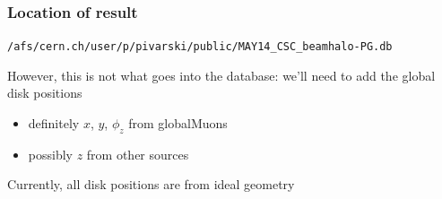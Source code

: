 \documentclass[compress]{beamer}
\begin{document}

\begin{frame}
\frametitle{Location of result}

{\tt /afs/cern.ch/user/p/pivarski/public/MAY14\_CSC\_beamhalo-PG.db}

\vfill
However, this is not what goes into the database: we'll need to add the global disk positions
\begin{itemize}
\item definitely $x$, $y$, $\phi_z$ from globalMuons
\item possibly $z$ from other sources
\end{itemize}
Currently, all disk positions are from ideal geometry

\label{numpages}
\end{frame}
\end{document}
